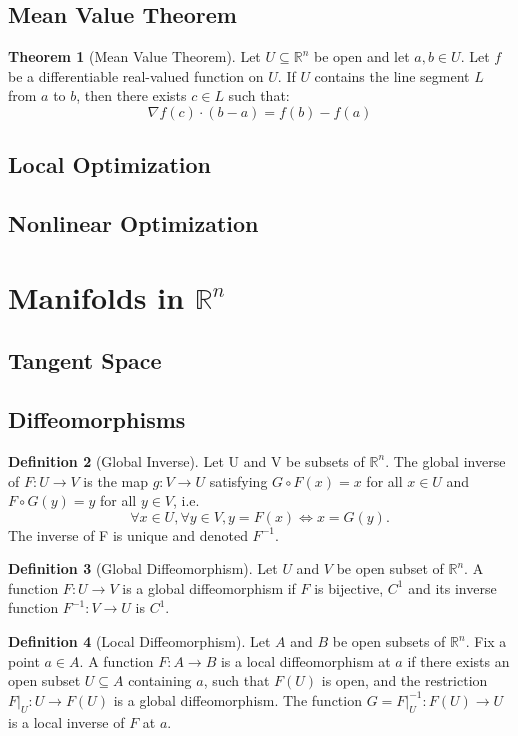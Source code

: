 \documentclass[12pt]{article}
\theoremstyle{definition}
\newtheorem{definition}{Definition}[subsection]
\newtheorem{theorem}[definition]{Theorem}
\theoremstyle{remark}
\begin{document}
\subsection{Mean Value Theorem}
\begin{theorem}[Mean Value Theorem]
Let $U\subseteq\mathbb{R}^n$ be open and let $a,b\in U$. Let $f$ be a differentiable real-valued function on $U$. If $U$ contains the line segment $L$ from $a$ to $b$, then there exists $c\in L$ such that:
\[
\nabla f(c)\cdot(b-a)=f(b)-f(a)
\]
\end{theorem}
\subsection{Local Optimization}

\subsection{Nonlinear Optimization}

\section{Manifolds in $\mathbb{R}^n$}
\subsection{Tangent Space}

\subsection{Diffeomorphisms}
\begin{definition}[Global Inverse]
Let U and V be subsets of $\mathbb{R}^n$. The global inverse of $F: U\rightarrow V$ is the map $g: V\rightarrow U$ satisfying $G\circ F(x)=x$ for all $x\in U$ and $F\circ G(y)=y$ for all $y\in V$, i.e.
\[
\forall x\in U, \forall y\in V, y=F(x)\Longleftrightarrow x=G(y). 
\]
The inverse of F is unique and denoted $F^{-1}$.
\end{definition}

\begin{definition}[Global Diffeomorphism]
Let $U$ and $V$ be open subset of $\mathbb{R}^n$. A function $F:U\rightarrow V$ is a global diffeomorphism if $F$ is bijective, $C^1$ and its inverse function $F^{-1}:V\rightarrow U$ is $C^1.$
\end{definition}

\begin{definition}[Local Diffeomorphism]
Let $A$ and $B$ be open subsets of $\mathbb{R}^n.$ Fix a point $a\in A.$ A function $F:A\rightarrow B$ is a local diffeomorphism at $a$ if there exists an open subset $U\subseteq A$ containing $a$, such that $F(U)$ is open, and the restriction $F|_U: U\rightarrow F(U)$ is a global diffeomorphism. The function $G=F|_U^{-1}: F(U)\rightarrow U$ is a local inverse of $F$ at $a.$
\end{definition}
\end{document}
